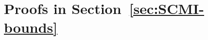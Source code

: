 \documentclass[onecolumn,romanappendices,10pt]{IEEEtran}
\newcommand{\Acal}{{\mathcal A}}
\begin{document}
	
	\section{Proofs in Section~\ref{sec:SCMI-bounds}}\label{app:SCMI-bounds}
	\setcounter{subsection}{0}
\end{document}
